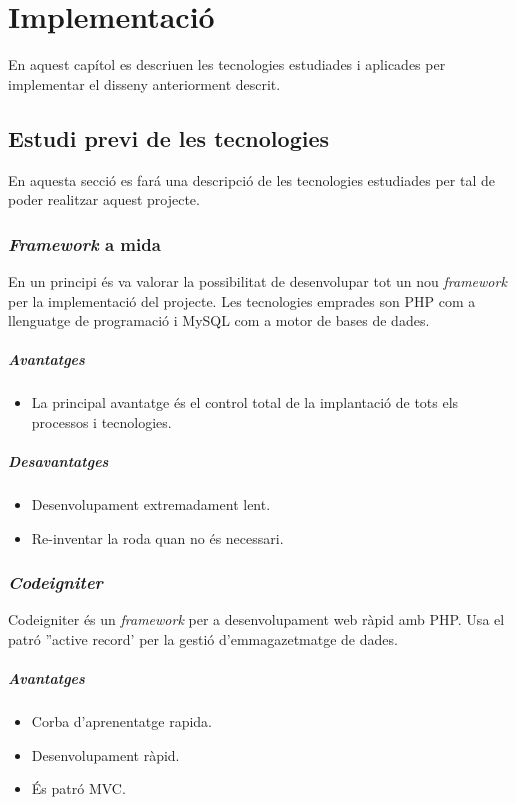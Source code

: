 \chapter{Implementaci\'{o}}
\label{cha:implementation}
En aquest capítol es descriuen les tecnologies estudiades i aplicades per implementar el disseny anteriorment descrit.


\section{Estudi previ de les tecnologies}
En aquesta secci\'{o} es far\'{a} una descripci\'{o} de les tecnologies estudiades per tal de poder realitzar aquest projecte. 

\subsection{\textit{Framework} a mida}
En un principi \'{e}s va valorar la possibilitat de desenvolupar tot un nou \textit{framework} per la implementaci\'{o} del projecte. Les tecnologies emprades son PHP com a llenguatge de programaci\'{o} i MySQL com a motor de bases de dades.
\paragraph{Avantatges}
\begin{itemize} 
\item La principal avantatge \'{e}s el control total de la implantaci\'{o} de tots els processos i tecnologies.
\end{itemize} 

\paragraph{Desavantatges}
\begin{itemize} 
\item Desenvolupament extremadament lent.
\item Re-inventar la roda quan no \'{e}s necessari.
\end{itemize} 

\subsection{\textit{Codeigniter}}
Codeigniter \'{e}s un \textit{framework} per a desenvolupament web r\`{a}pid amb PHP.\cite{codeigniter} Usa el patr\'{o} ''active record' per la gesti\'{o} d'emmagazetmatge de dades.\cite{activerecord}
\paragraph{Avantatges}
\begin{itemize}
\item Corba d'aprenentatge rapida.
\item Desenvolupament r\`{a}pid.
\item \'{E}s patr\'{o} MVC.
\end{itemize}

